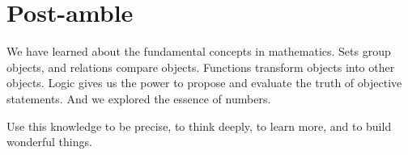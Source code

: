 \documentclass[letterpaper]{article}
\begin{document}









\section*{Post-amble}
We have learned about the fundamental concepts in mathematics. Sets group
objects, and relations compare objects. Functions transform objects into other
objects. Logic gives us the power to propose and evaluate the truth of objective
statements. And we explored the essence of numbers.

Use this knowledge to be precise, to think deeply, to learn more, and to build
wonderful things.
\end{document}
